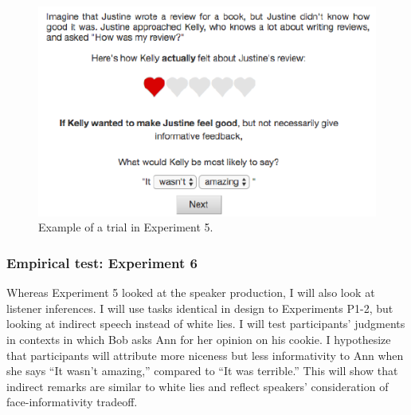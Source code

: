 \begin{CodeChunk}
\captionsetup{width=0.8\textwidth}\begin{figure}[h]

{\centering \includegraphics{figures/expt_screen-1} 

}

\caption[Example of a trial in Experiment 1]{Example of a trial in Experiment 5.}\label{fig:expt2_screen}
\end{figure}
\end{CodeChunk}



\subsubsection{Empirical test: Experiment 6} Whereas Experiment 5 looked at the speaker production, I will also look at listener inferences. I will use tasks identical in design to Experiments P1-2, but looking at indirect speech instead of white lies. I will test participants' judgments in contexts in which Bob asks Ann for her opinion on his cookie. I hypothesize that participants will attribute more niceness but less informativity to Ann when she says ``It wasn't amazing,'' compared to ``It was terrible.'' This will show that indirect remarks are similar to white lies and reflect speakers' consideration of face-informativity tradeoff.






